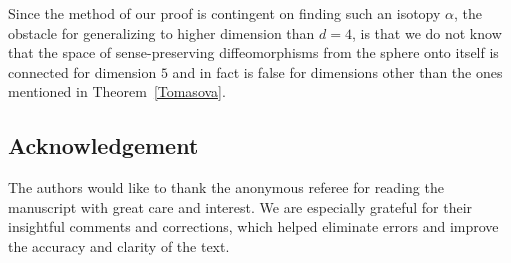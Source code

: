 \documentclass[12pt,a4paper]{amsart}
\theoremstyle{plain}
\theoremstyle{definition}
\numberwithin{equation}{section}
\begin{document}
	Since the method of our proof is contingent on finding such an isotopy $\alpha$, the obstacle for generalizing to higher dimension than $d=4$, is that we do not know that the space of sense-preserving diffeomorphisms from the sphere onto itself is connected for dimension $5$ and in fact is false for dimensions other than the ones mentioned in Theorem~\ref{Tomasova}.
	
	\subsection*{Acknowledgement}
	The authors would like to thank the anonymous referee for reading the manuscript with great care and interest. We are especially grateful for their insightful comments and corrections, which helped eliminate errors and improve the accuracy and clarity of the text.
	
\end{document}
